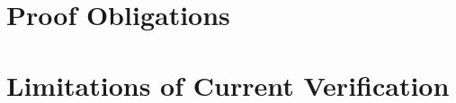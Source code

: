 \section{Proof Obligations}
\label{sec:proof_obligations}

\section{Limitations of Current Verification}
\label{sec:limitations_verification}
